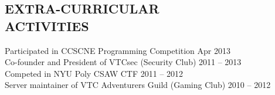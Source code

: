 \documentclass[margin]{res}
\begin{document}
\begin{resume}
\section{EXTRA-CURRICULAR \\ ACTIVITIES} 
                Participated in CCSCNE Programming Competition
                	\hfill Apr 2013\\
                Co-founder and President of VTCsec (Security Club) 
                    \hfill 2011 -- 2013\\
                Competed in NYU Poly CSAW CTF \hfill 2011 -- 2012\\
                Server maintainer of VTC Adventurers Guild (Gaming Club)
                    \hfill 2010 -- 2012\\
 

\end{resume}
\end{document}
